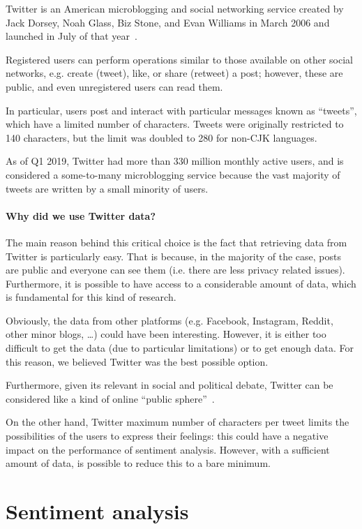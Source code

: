 Twitter is an American microblogging and social networking service created by Jack Dorsey, Noah Glass, Biz Stone, and Evan Williams in March 2006 and launched in July of that year~\cite{enwiki:1027840990}.

Registered users can perform operations similar to those available on other social networks, e.g. create (tweet), like, or share (retweet) a post; however, these are public, and even unregistered users can read them. 

In particular, users post and interact with particular messages known as “tweets”, which have a limited number of characters. Tweets were originally restricted to 140 characters, but the limit was doubled to 280 for non-CJK languages.

As of Q1 2019, Twitter had more than 330 million monthly active users, and is considered a some-to-many microblogging service because the vast majority of tweets are written by a small minority of users.

\paragraph{Why did we use Twitter data?}

The main reason behind this critical choice is the fact that retrieving data from Twitter is particularly easy. That is because, in the majority of the case, posts are public and everyone can see them (i.e. there are less privacy related issues). Furthermore, it is possible to have access to a considerable amount of data, which is fundamental for this kind of research. 

Obviously, the data from other platforms (e.g. Facebook, Instagram, Reddit, other minor blogs, \ldots) could have been interesting. However, it is either too difficult to get the data (due to particular limitations) or to get enough data. For this reason, we believed Twitter was the best possible option.

Furthermore, given its relevant in social and political debate, Twitter can be considered like a kind of online “public sphere”~\cite{doi:10.1080/1369118X.2012.756050}.

On the other hand, Twitter maximum number of characters per tweet limits the possibilities of the users to express their feelings: this could have a negative impact on the performance of sentiment analysis. However, with a sufficient amount of data, is possible to reduce this to a bare minimum. 

\section{Sentiment analysis}
\label{sec:sentiment-analysis}

